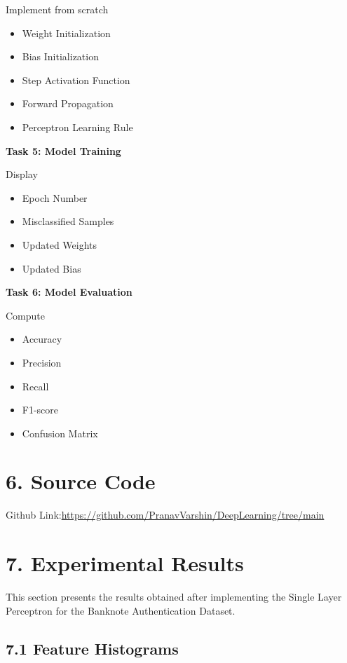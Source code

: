 \documentclass{article}
\begin{document}
Implement from scratch

\begin{itemize}
\item Weight Initialization
\item Bias Initialization
\item Step Activation Function
\item Forward Propagation
\item Perceptron Learning Rule
\end{itemize}

\vspace{2mm}

\textbf{Task 5: Model Training}

Display

\begin{itemize}
\item Epoch Number
\item Misclassified Samples
\item Updated Weights
\item Updated Bias
\end{itemize}

\clearpage
\textbf{Task 6: Model Evaluation}

Compute

\begin{itemize}
\item Accuracy
\item Precision
\item Recall
\item F1-score
\item Confusion Matrix
\end{itemize}
\section*{6. Source Code}
    Github Link:\url{https://github.com/PranavVarshin/DeepLearning/tree/main}
\clearpage


\section*{7. Experimental Results}

This section presents the results obtained after implementing the Single Layer Perceptron for the Banknote Authentication Dataset.


\subsection*{7.1 Feature Histograms}
\end{document}
